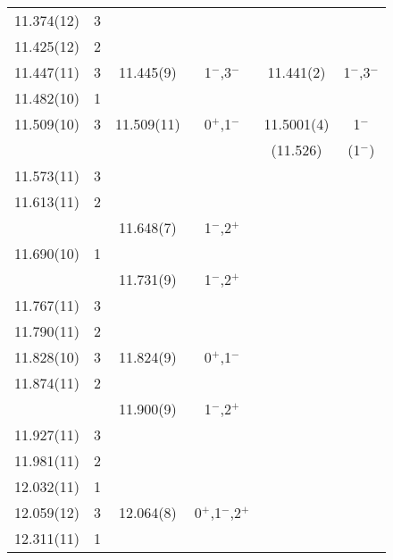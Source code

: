 \begin{center}
\begin{longtable}{cc cc cc}
    11.374(12)    & 3        &                  &                     &             &                 \\
    11.425(12)    & 2        &                  &                     &             &                 \\
    11.447(11)    & 3        &  11.445(9)       &  1$^-$,3$^-$        & 11.441(2)   &  1$^-$,3$^-$    \\
    11.482(10)    & 1        &                  &                     &             &                 \\
    11.509(10)    & 3        &  11.509(11)      &  0$^+$,1$^-$        & 11.5001(4)  &  1$^-$          \\
                  &          &                  &                     & (11.526)    &  (1$^-$)        \\
     11.573(11)   & 3        &                  &                     &             &                 \\
     11.613(11)   & 2        &                  &                     &             &                 \\
                  &          &  11.648(7)       & 1$^-$,2$^+$         &             &                 \\
   11.690(10)     & 1        &                  &                     &             &                 \\
                  &          &  11.731(9)       & 1$^-$,2$^+$         &             &                 \\
   11.767(11)     & 3        &                  &                     &             &                 \\
   11.790(11)     & 2        &                  &                     &             &                 \\
   11.828(10)     & 3        &  11.824(9)       & 0$^+$,1$^-$         &             &                 \\
     11.874(11)   & 2        &                  &                     &             &                 \\
                  &          &  11.900(9)       & 1$^-$,2$^+$         &             &                 \\
    11.927(11)    & 3        &                  &                     &             &                 \\
    11.981(11)    & 2        &                  &                     &             &                 \\
     12.032(11)   & 1        &                  &                     &             &                 \\
     12.059(12)   & 3        &  12.064(8)       & 0$^+$,1$^-$,2$^+$   &             &                 \\
    12.311(11)    & 1        &                  &                     &             &                 \\

    \end{longtable}
\end{center}
